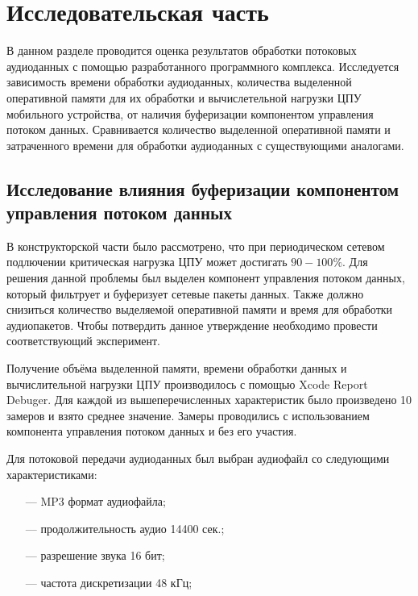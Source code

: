 \section{Исследовательская часть}

\par В данном разделе проводится оценка результатов обработки потоковых аудиоданных с помощью разработанного программного комплекса.
Исследуется зависимость времени обработки аудиоданных, количества выделенной оперативной памяти для их обработки и вычислетельной нагрузки ЦПУ мобильного устройства, 
от наличия буферизации компонентом управления потоком данных.
Сравнивается количество выделенной оперативной памяти и затраченного времени для обработки аудиоданных с существующими аналогами.

\subsection{Исследование влияния буферизации компонентом управления потоком данных}
    \par В конструкторской части было рассмотрено, 
    что при периодическом сетевом подлючении критическая нагрузка ЦПУ может достигать $90-100\%$.
    Для решения данной проблемы был выделен компонент управления потоком данных, 
    который фильтрует и буферизует сетевые пакеты данных. 
    Также должно снизиться количество выделяемой оперативной памяти и время для обработки аудиопакетов.
    Чтобы потвердить данное утверждение необходимо провести соответствующий эксперимент.

    \par Получение объёма выделенной памяти, времени обработки данных и вычислительной нагрузки ЦПУ производилось с помощью Xcode Report Debuger.
    Для каждой из вышеперечисленных характеристик было произведено 10 замеров и взято среднее значение.
    Замеры проводились с использованием компонента управления потоком данных и без его участия.
    
    \par Для потоковой передачи аудиоданных был выбран аудиофайл со следующими характеристиками:
    \begin{itemize}
        \item[---] MP3 формат аудиофайла;
        \item[---] продолжительность аудио 14400 сек.;
        \item[---] разрешение звука 16 бит;
        \item[---] частота дискретизации 48 кГц;
    \end{itemize}

